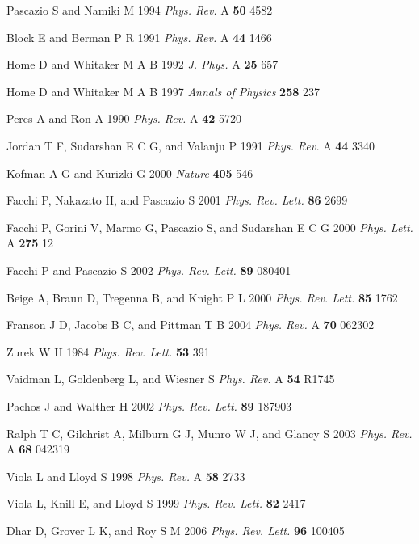 \documentclass[12pt]{article}
\begin{document}
\begin{thebibliography}{99}
Pascazio S and Namiki M 1994 {\it Phys. Rev.} A
{\bf 50} 4582

Block E and Berman P R 1991 {\it Phys. Rev.} A {\bf
44} 1466

Home D and Whitaker M A B 1992 {\it J. Phys.} A {\bf
25} 657

Home D and Whitaker M A B 1997 {\it Annals of
Physics} {\bf 258} 237

Peres A and Ron A 1990 {\it Phys. Rev.} A {\bf 42}
5720

Jordan T F, Sudarshan E C G, and Valanju P 1991 {\it
Phys. Rev.} A {\bf 44} 3340

Kofman A G and Kurizki G 2000 {\it Nature} {\bf
405} 546

Facchi P, Nakazato H, and Pascazio S 2001 {\it Phys.
Rev. Lett.} {\bf 86} 2699

Facchi P, Gorini V, Marmo G, Pascazio S, and
Sudarshan E C G 2000 {\it Phys. Lett.} A {\bf 275} 12

Facchi P and Pascazio S 2002 {\it Phys. Rev.
Lett.} {\bf 89} 080401

Beige A, Braun D, Tregenna B, and Knight P L 2000
{\it Phys. Rev. Lett.} {\bf 85} 1762

Franson J D, Jacobs B C, and Pittman T B 2004
{\it Phys. Rev.} A {\bf 70} 062302

Zurek W H 1984 {\it Phys. Rev. Lett.} {\bf 53} 391

Vaidman L, Goldenberg L, and Wiesner S {\it Phys.
Rev.} A {\bf 54} R1745

Pachos J and Walther H 2002 {\it Phys. Rev. Lett.}
{\bf 89} 187903

Ralph T C, Gilchrist A, Milburn G J, Munro W J, and
Glancy S 2003 {\it Phys. Rev.} A {\bf 68} 042319

Viola L and Lloyd S 1998 {\it Phys. Rev.} A
{\bf 58} 2733

Viola L, Knill E, and Lloyd S 1999 {\it Phys. Rev.
Lett.} {\bf 82} 2417

Dhar D, Grover L K, and Roy S M 2006 {\it Phys. Rev.
Lett.} {\bf 96} 100405



\end{thebibliography}
\end{document}
